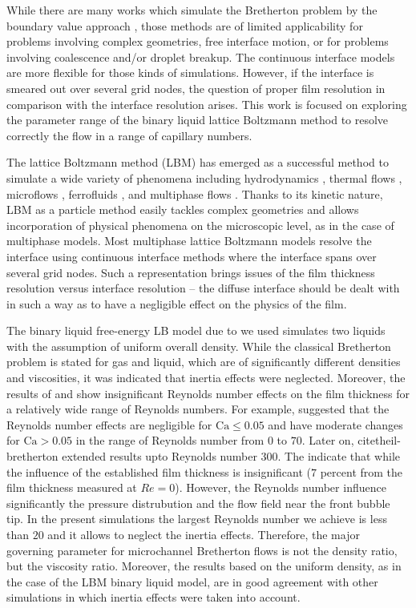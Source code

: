 \documentclass[preprint,12pt]{elsarticle}
\newcommand{\Ca}{\mathrm{Ca}}
\begin{document}
While there are many works which simulate the Bretherton problem by the boundary value approach
\cite{ingham-plates,heil-bretherton}, those methods are of limited applicability for problems
involving complex geometries, free interface motion, or for problems involving coalescence and/or
droplet breakup. The continuous interface models are more flexible for those kinds of simulations.
However, if the interface is smeared out over several grid nodes, the question of
proper film resolution in comparison with the interface resolution arises.  This work is focused on
exploring the parameter range of the binary liquid lattice
Boltzmann method to resolve correctly the flow in a range of capillary numbers.

The lattice Boltzmann method (LBM) has emerged as a successful method to simulate
a wide variety of phenomena including hydrodynamics \cite{yu}, thermal flows
\cite{karlin-minimalmodels}, microflows \cite{ansumali-small-knudsen},
ferrofluids \cite{kuzmin-aniso}, and multiphase flows
\cite{swift,Shan-chen:extended}. Thanks to its kinetic nature, LBM as a particle
method easily tackles complex geometries and allows incorporation of
physical phenomena on the microscopic level, as in the case of multiphase models. Most
multiphase lattice Boltzmann models \cite{swift, Shan-chen:extended} resolve
the interface using continuous interface methods where the interface spans over several grid nodes.
Such a representation
brings issues of the film thickness resolution versus interface
resolution -- the diffuse interface should be dealt with in such a way as to have a
negligible effect on the physics of the film.

The binary liquid free-energy LB model due to \citet{swift} we used
simulates two liquids with the assumption of uniform overall
density. While the classical Bretherton problem is stated for gas and liquid, which are of
significantly
different densities and viscosities, it was indicated \cite{bretherton} that inertia effects were
neglected. Moreover, the results of \citet{giavedoni-numerical} and \citet{heil-bretherton} show
{\color{red} insignificant} Reynolds number effects on the film thickness for a relatively wide
range of Reynolds
numbers. 
{\color{red} For example, \citet{giavedoni-numerical} suggested that the Reynolds number effects
are negligible for $\Ca\leq0.05$ and have moderate changes for $\Ca>0.05$ in the range of Reynolds
number from $0$ to $70$. Later on, citet{heil-bretherton} extended results upto Reynolds number
$300$. The indicate that while the influence of the established film thickness is insignificant
($7$ percent from the film thickness measured at $Re=0$). However, the Reynolds number influence
significantly the pressure distrubution and the flow field near the front bubble tip. In the present
simulations the largest Reynolds number we achieve is less than $20$ and it allows to neglect the
inertia effects.} 
Therefore, the major governing parameter for microchannel Bretherton flows is not the density ratio,
but the
viscosity ratio. Moreover, the results based on the uniform density, as in the case of the LBM
binary liquid model, are in good agreement with other simulations
\cite{giavedoni-numerical,heil-bretherton} in which inertia effects were taken into account.
\end{document}
